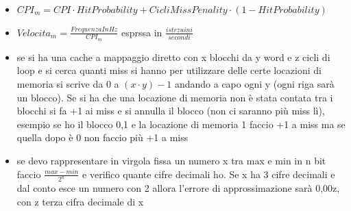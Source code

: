 \documentclass[a4paper,12pt, oneside]{book}
\begin{document}
\begin{itemize}
\item $CPI_m=CPI\cdot HitProbability+CicliMissPenality\cdot (1-HitProbability)$
\item $Velocita_m=\frac{FrequenzaInHz}{CPI_m}$ esprssa in $\frac{istrzuini}{secondi}$
\item se si ha una cache a mappaggio diretto con x blocchi da y word e z cicli di loop e si cerca quanti miss si hanno per utilizzare delle certe locazioni di memoria si scrive da 0 a $(x\cdot y)-1$ andando a capo ogni y (ogni riga sarà un blocco). Se si ha che una locazione di memoria non è stata contata tra i blocchi si fa +1 ai miss e si annulla il blocco (non ci saranno più miss lì), esempio se ho il blocco 0,1 e la locazione di memoria 1 faccio +1 a miss ma se quella dopo è 0 non faccio più +1 a miss
\item se devo rappresentare in virgola fissa un numero x tra max e min in n bit faccio $\frac{max-min}{2^n}$ e verifico quante cifre decimali ho. Se x ha 3 cifre decimali e dal conto esce un numero con 2 allora l'errore di approssimazione sarà 0,00z, con z terza cifra decimale di x

\end{itemize}
\end{document}
